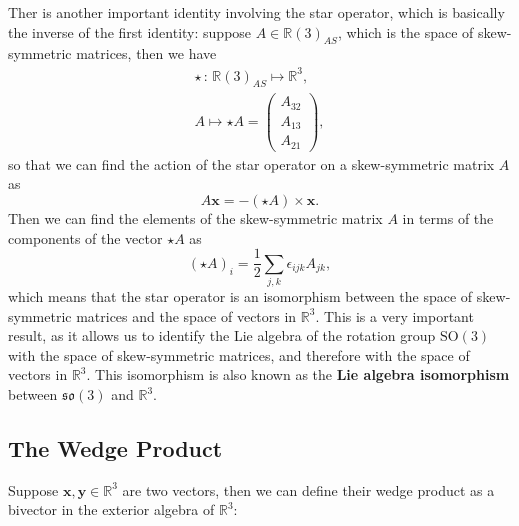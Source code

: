 Ther is another important identity involving the star operator, which is basically the inverse of the first identity: suppose \(A \in \mathbb{R}(3)_{AS}\), which is the space of skew-symmetric matrices, then we have
\[
    \begin{aligned}
        \star \, : \, \mathbb{R}(3)_{AS} \mapsto \mathbb{R}^3, \\
        A \mapsto \star A = \begin{pmatrix}
                                A_{32} \\
                                A_{13} \\
                                A_{21}
                            \end{pmatrix},
    \end{aligned}
\]
so that we can find the action of the star operator on a skew-symmetric matrix \(A\) as
\[
    A \mathbf{x} = - (\star A) \times \mathbf{x}.
\]
Then we can find the elements of the skew-symmetric matrix \(A\) in terms of the components of the vector \(\star A\) as
\[
    (\star A)_{i} = \frac{1}{2} \sum_{j, k} \epsilon_{ijk} A_{jk},
\]
which means that the star operator is an isomorphism between the space of skew-symmetric matrices and the space of vectors in \(\mathbb{R}^3\). This is a very important result, as it allows us to identify the Lie algebra of the rotation group \(\mathrm{SO}(3)\) with the space of skew-symmetric matrices, and therefore with the space of vectors in \(\mathbb{R}^3\). This isomorphism is also known as the \textbf{Lie algebra isomorphism} between \(\mathfrak{so}(3)\) and \(\mathbb{R}^3\).

\subsection{The Wedge Product}

Suppose \(\mathbf{x}, \mathbf{y} \in \mathbb{R}^3\) are two vectors, then we can define their wedge product as a bivector in the exterior algebra of \(\mathbb{R}^3\):

